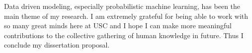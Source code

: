 Data driven modeling, especially probabilistic machine learning, has been the main theme of my
research. I am extremely grateful for being able to work with so many great minds here at USC and I
hope I can make more meaningful contributions to the collective gathering of human knowledge in
future. Thus I conclude my dissertation proposal.
